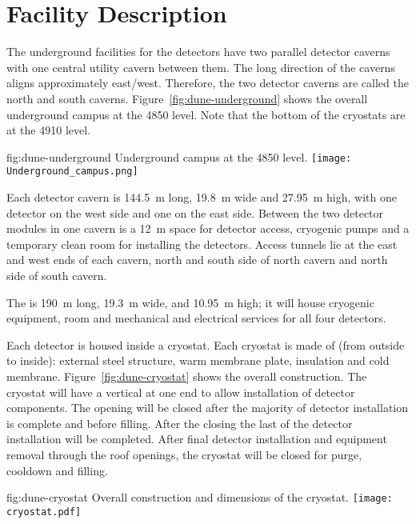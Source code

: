 ﻿\chapter{Facility Description}
\label{vl:tc-facility}




The underground facilities for the  detectors have two parallel
detector caverns with one central utility cavern between them. The
long direction of the caverns aligns approximately
east/west. Therefore, the two detector caverns are called the north
and south caverns. Figure~\ref{fig:dune-underground} shows the overall
underground campus at the  4850 level. Note that the bottom of the cryostats are at the 4910 level.
\begin{dunefigure}{fig:dune-underground}
  {Underground campus at the 4850 level.}
  \texttt{[image: Underground\_campus.png]}
\end{dunefigure}
Each detector cavern is \SI{144.5}{\meter} long, \SI{19.8}{\meter}
wide and \SI{27.95}{\meter} high, with one detector on the west side
and one on the east side. Between the two detector modules in one
cavern is a \SI{12}{\meter} space for detector access, cryogenic pumps and
a temporary clean
room for installing the detectors. Access tunnels lie at the east and
west ends of each cavern, north and south side of north cavern and
north side of south cavern.


The  is \SI{190}{\meter} long, \SI{19.3}{\meter}
wide, and \SI{10.95}{\meter} high; it will house cryogenic equipment, 
room and mechanical and electrical services for all four
detectors.


Each detector is housed inside a cryostat. Each cryostat is made of
(from outside to inside): external steel structure, warm membrane
plate, insulation and cold membrane. Figure~\ref{fig:dune-cryostat}
shows the overall construction. The cryostat will have a vertical
 at one end to allow installation of detector components. The
opening will be closed after the majority of detector installation is
complete and before filling. After the  closing the last of the
detector installation will be completed. After final detector
installation and equipment removal through the roof openings, the
cryostat will be closed for purge, cooldown and filling.
\begin{dunefigure}{fig:dune-cryostat}
  {Overall construction and dimensions of the  cryostat.}
  \texttt{[image: cryostat.pdf]}
\end{dunefigure}


